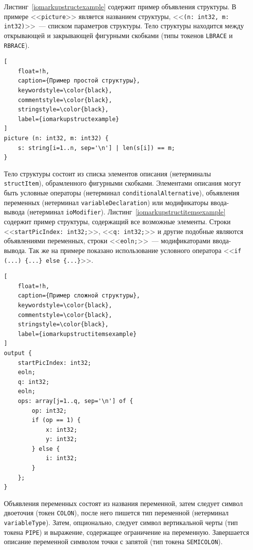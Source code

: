 \documentclass[times,specification,annotation]{style/itmo-student-thesis/itmo-student-thesis}
\begin{document}
Листинг~\ref{iomarkupstructexample} содержит пример объявления структуры. В примере <<\texttt{picture}>> является названием структуры, <<\texttt{(n: int32, m: int32)}>>~--- списком параметров структуры. Тело структуры находится между открывающей и закрывающей фигурными скобками (типы токенов \texttt{LBRACE} и \texttt{RBRACE}).

\begin{lstlisting}[
    float=!h,
    caption={Пример простой структуры},
    keywordstyle=\color{black},
    commentstyle=\color{black},
    stringstyle=\color{black},
    label={iomarkupstructexample}
]
picture (n: int32, m: int32) {
    s: string[i=1..n, sep='\n'] | len(s[i]) == m;
}
\end{lstlisting}

Тело структуры состоит из списка элементов описания (нетерминалы \texttt{structItem}), обрамленного фигурными скобками. Элементами описания могут быть условные операторы (нетерминал \texttt{conditionalAlternative}), объявления переменных (нетерминал \texttt{variableDeclaration}) или модификаторы ввода-вывода (нетерминал \texttt{ioModifier}). Листинг~\ref{iomarkupstructitemsexample} содержит пример структуры, содержащий все возможные элементы. Строки <<\texttt{startPicIndex: int32;}>>, <<\texttt{q: int32;}>> и другие подобные являются объявлениями переменных, строки <<\texttt{eoln;}>>~--- модификаторами ввода-вывода. Так же на примере показано использование условного оператора <<\texttt{if (...) \{...\} else \{...\}}>>.

\begin{lstlisting}[
    float=!h,
    caption={Пример сложной структуры},
    keywordstyle=\color{black},
    commentstyle=\color{black},
    stringstyle=\color{black},
    label={iomarkupstructitemsexample}
]
output {
    startPicIndex: int32;
    eoln;
    q: int32;
    eoln;
    ops: array[j=1..q, sep='\n'] of {
        op: int32;
        if (op == 1) {
            x: int32;
            y: int32;
        } else {
            i: int32;
        }
    };
}

\end{lstlisting}

Объявления переменных состоят из названия переменной, затем следует символ двоеточия (токен \texttt{COLON}), после него пишется тип переменной (нетерминал \texttt{variableType}). Затем, опционально, следует символ вертикальной черты (тип токена \texttt{PIPE}) и выражение, содержащее ограничение на переменную. Завершается описание переменной символом точки с запятой (тип токена \texttt{SEMICOLON}).
\end{document}
